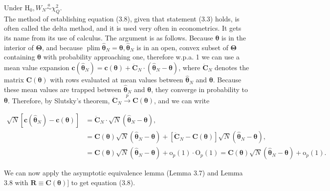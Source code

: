 \documentclass[10pt]{article}
\begin{document}
Under $\mathrm{H}_{0}, W_{N} \stackrel{a}{\sim} \chi_{Q}^{2}$.\\
The method of establishing equation (3.8), given that statement (3.3) holds, is often called the delta method, and it is used very often in econometrics. It gets its name from its use of calculus. The argument is as follows. Because $\boldsymbol{\theta}$ is in the interior of $\boldsymbol{\Theta}$, and because $\operatorname{plim} \hat{\boldsymbol{\theta}}_{N}=\boldsymbol{\theta}, \hat{\boldsymbol{\theta}}_{N}$ is in an open, convex subset of $\boldsymbol{\Theta}$ containing $\boldsymbol{\theta}$ with probability approaching one, therefore w.p.a. 1 we can use a mean value expansion $\mathbf{c}\left(\hat{\boldsymbol{\theta}}_{N}\right)=\mathbf{c}(\boldsymbol{\theta})+\ddot{\mathbf{C}}_{N} \cdot\left(\hat{\boldsymbol{\theta}}_{N}-\boldsymbol{\theta}\right)$, where $\ddot{\mathbf{C}}_{N}$ denotes the matrix $\mathbf{C}(\boldsymbol{\theta})$ with rows evaluated at mean values between $\hat{\boldsymbol{\theta}}_{N}$ and $\boldsymbol{\theta}$. Because these mean values are trapped between $\hat{\boldsymbol{\theta}}_{N}$ and $\boldsymbol{\theta}$, they converge in probability to $\boldsymbol{\theta}$. Therefore, by Slutsky's theorem, $\ddot{\mathbf{C}}_{N} \xrightarrow{p} \mathbf{C}(\boldsymbol{\theta})$, and we can write

$$
\begin{aligned}
\sqrt{N}\left[\mathbf{c}\left(\hat{\boldsymbol{\theta}}_{N}\right)-\mathbf{c}(\boldsymbol{\theta})\right] & =\ddot{\mathbf{C}}_{N} \cdot \sqrt{N}\left(\hat{\boldsymbol{\theta}}_{N}-\boldsymbol{\theta}\right), \\
& =\mathbf{C}(\boldsymbol{\theta}) \sqrt{N}\left(\hat{\boldsymbol{\theta}}_{N}-\boldsymbol{\theta}\right)+\left[\ddot{\mathbf{C}}_{N}-\mathbf{C}(\boldsymbol{\theta})\right] \sqrt{N}\left(\hat{\boldsymbol{\theta}}_{N}-\boldsymbol{\theta}\right), \\
& =\mathbf{C}(\boldsymbol{\theta}) \sqrt{N}\left(\hat{\boldsymbol{\theta}}_{N}-\boldsymbol{\theta}\right)+\mathrm{o}_{p}(1) \cdot \mathrm{O}_{p}(1)=\mathbf{C}(\boldsymbol{\theta}) \sqrt{N}\left(\hat{\boldsymbol{\theta}}_{N}-\boldsymbol{\theta}\right)+\mathrm{o}_{p}(1) .
\end{aligned}
$$

We can now apply the asymptotic equivalence lemma (Lemma 3.7) and Lemma 3.8 with $\mathbf{R} \equiv \mathbf{C}(\boldsymbol{\theta})]$ to get equation (3.8).
\end{document}
